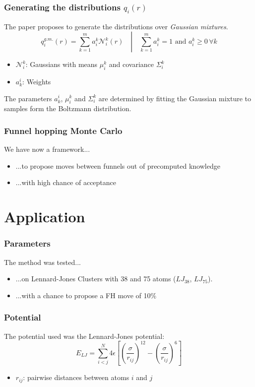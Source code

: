\documentclass{beamer}
\begin{document}
	\begin{frame}
		\frametitle{Generating the distributions $q_i(r)$}
		The paper proposes to generate the distributions over \emph{Gaussian mixtures}.
		\begin{equation}
			q_i^{g.m.}(r)=\left.\sum_{k=1}^m a_i^k \mathcal{N}_i^k(r) \quad\right|\quad \sum_{k=1}^m a_i^k=1\text{ and } a_i^k \geq0\,\forall k
		\end{equation}
		\begin{itemize}
			\item $\mathcal{N}_i^k$: Gaussians with means $\mu_i^k$ and covariance $\Sigma_i^k$
			\item $a_k^i$: Weights
		\end{itemize}
		The  parameters $a_k^i$, $\mu_i^k$ and $\Sigma_i^k$ are determined by fitting the Gaussian mixture to samples form the Boltzmann distribution.
	\end{frame}


	\begin{frame}
		\frametitle{Funnel hopping Monte Carlo}
		We have now a framework...
		\begin{itemize}
			\item ...to propose moves between funnels out of precomputed knowledge
			\item ...with high chance of acceptance
		\end{itemize}
	\end{frame}

	\section{Application}

	\begin{frame}
		\frametitle{Parameters}
		The method was tested...
		\begin{itemize}
			\item  ...on Lennard-Jones Clusters with 38 and 75 atoms ($LJ_{38}$, $LJ_{75}$).
			\item  ...with a chance to propose a FH move of 10$\%$
		\end{itemize}
	\end{frame}

	\begin{frame}
		\frametitle{Potential}
		The potential used was the Lennard-Jones potential:
		\begin{equation}
			E_{LJ}=\sum_{i<j}^N 4\epsilon\left[\left(\frac{\sigma}{r_{ij}}\right)^{12}-\left(\frac{\sigma}{r_{ij}}\right)^6\right]
		\end{equation}
		\begin{itemize}
			\item $r_{ij}$: pairwise distances between atoms $i$ and $j$
		\end{itemize}
	\end{frame}
\end{document}
